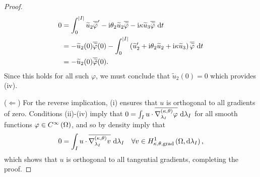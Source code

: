 \begin{proof}
\begin{align*}
		0 
		&= \int_0^{\left\lvert I \right\rvert} \widetilde{u}_2\overline{\widetilde{\varphi}}' - \mathrm{i}\theta_2\widetilde{u}_2\overline{\widetilde{\varphi}} - \mathrm{i}\kappa\widetilde{u}_3\overline{\widetilde{\varphi}} \ \mathrm{d} t \\
		&= -\widetilde{u}_2(0)\overline{\widetilde{\varphi}}(0)
		- \int_0^{\left\lvert I \right\rvert} \left(  \widetilde{u}'_2 + \mathrm{i}\theta_2\widetilde{u}_2 + \mathrm{i}\kappa\widetilde{u}_3  \right)\overline{\widetilde{\varphi}} \ \mathrm{d} t \\
		&= -\widetilde{u}_2(0)\overline{\widetilde{\varphi}}(0).
	\end{align*}
	Since this holds for all such $\varphi$, we must conclude that $\widetilde{u}_2(0)=0$ which provides (iv).
	
	($\Leftarrow$) For the reverse implication, (i) ensures that $u$ is orthogonal to all gradients of zero.
	Conditions (ii)-(iv) imply that $0 = \int_{I} u\cdot\overline{\nabla^{\left( \kappa, \theta \right)}_{\lambda_I}\varphi}  \ \mathrm{d}\lambda_I$ for all smooth functions $\varphi\in C^{\infty}\left( \Omega \right)$, and so by density imply that
	\begin{align*}
		0 = \int_{I} u\cdot\overline{\nabla^{\left( \kappa, \theta \right)}_{\lambda_I}v}  \ \mathrm{d}\lambda_I \quad\forall v\in H^1_{\kappa,\theta,\mathrm{grad}}\left( \Omega, \mathrm{d}\lambda_I \right),
	\end{align*}
	which shows that $u$ is orthogonal to all tangential gradients, completing the proof.
\end{proof}

